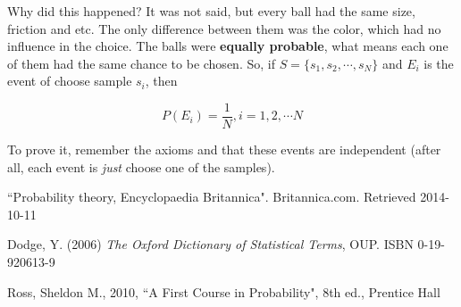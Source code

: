 \documentclass[a4paper,twocolumn]{article}
\begin{document}
Why did this happened? It was not said, but every ball had the same size, friction and etc. The only difference between them was the color, which had no influence in the choice. The balls were \textbf{equally probable}, what means each one of them had the same chance to be chosen. So, if $S = \{s_1, s_2,\dotsm,s_N\}$ and $E_i$ is the event of choose sample $s_i$, then

\begin{equation}
\label{eq:equally_prob}
P(E_i) = \frac{1}{N}, i = 1, 2, \dotsm N
\end{equation}

\noindent To prove it, remember the axioms and that these events are independent (after all, each event is \textit{just} choose one of the samples).


\begin{thebibliography}{9}
         ``Probability theory, Encyclopaedia Britannica".
         Britannica.com.
         Retrieved 2014-10-11

        Dodge, Y. (2006)
        \textit{The Oxford Dictionary of Statistical Terms}, OUP.
        ISBN 0-19-920613-9

        Ross, Sheldon M.,
        2010,
        ``A First Course in Probability", 8th ed.,
        Prentice Hall
\end{thebibliography}
\end{document}
